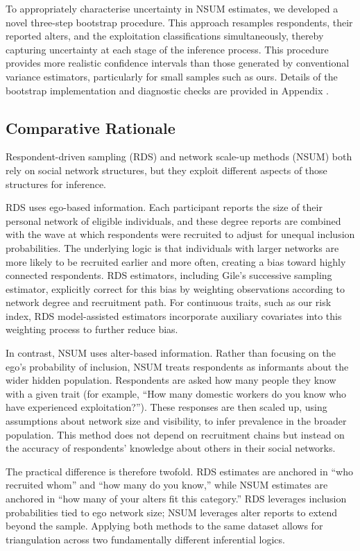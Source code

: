 \documentclass[
  12pt,
  letterpaper,
  DIV=11,
  numbers=noendperiod]{scrartcl}
\theoremstyle{plain}
\theoremstyle{definition}
\begin{document}
To appropriately characterise uncertainty in NSUM estimates, we
developed a novel three-step bootstrap procedure. This approach
resamples respondents, their reported alters, and the exploitation
classifications simultaneously, thereby capturing uncertainty at each
stage of the inference process. This procedure provides more realistic
confidence intervals than those generated by conventional variance
estimators, particularly for small samples such as ours. Details of the
bootstrap implementation and diagnostic checks are provided in Appendix
\textcite{app-3step}.

\subsection{Comparative Rationale}\label{comparative-rationale}

Respondent-driven sampling (RDS) and network scale-up methods (NSUM)
both rely on social network structures, but they exploit different
aspects of those structures for inference.

RDS uses ego-based information. Each participant reports the size of
their personal network of eligible individuals, and these degree reports
are combined with the wave at which respondents were recruited to adjust
for unequal inclusion probabilities. The underlying logic is that
individuals with larger networks are more likely to be recruited earlier
and more often, creating a bias toward highly connected respondents. RDS
estimators, including Gile's successive sampling estimator, explicitly
correct for this bias by weighting observations according to network
degree and recruitment path. For continuous traits, such as our risk
index, RDS model-assisted estimators incorporate auxiliary covariates
into this weighting process to further reduce bias.

In contrast, NSUM uses alter-based information. Rather than focusing on
the ego's probability of inclusion, NSUM treats respondents as
informants about the wider hidden population. Respondents are asked how
many people they know with a given trait (for example, ``How many
domestic workers do you know who have experienced exploitation?'').
These responses are then scaled up, using assumptions about network size
and visibility, to infer prevalence in the broader population. This
method does not depend on recruitment chains but instead on the accuracy
of respondents' knowledge about others in their social networks.

The practical difference is therefore twofold. RDS estimates are
anchored in ``who recruited whom'' and ``how many do you know,'' while
NSUM estimates are anchored in ``how many of your alters fit this
category.'' RDS leverages inclusion probabilities tied to ego network
size; NSUM leverages alter reports to extend beyond the sample. Applying
both methods to the same dataset allows for triangulation across two
fundamentally different inferential logics.
\end{document}
